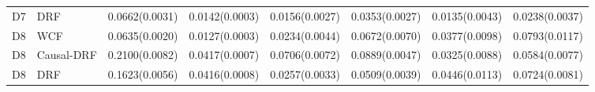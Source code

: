 \begin{table}[t]
\begin{tabular}{llrrrrrr}
D7 & DRF & 0.0662(0.0031) & 0.0142(0.0003) & 0.0156(0.0027) & 0.0353(0.0027) & 0.0135(0.0043) & 0.0238(0.0037) \\
D8 & WCF & 0.0635(0.0020) & 0.0127(0.0003) & 0.0234(0.0044) & 0.0672(0.0070) & 0.0377(0.0098) & 0.0793(0.0117) \\
D8 & Causal-DRF & 0.2100(0.0082) & 0.0417(0.0007) & 0.0706(0.0072) & 0.0889(0.0047) & 0.0325(0.0088) & 0.0584(0.0077) \\
D8 & DRF & 0.1623(0.0056) & 0.0416(0.0008) & 0.0257(0.0033) & 0.0509(0.0039) & 0.0446(0.0113) & 0.0724(0.0081) \\
\bottomrule
\end{tabular}
\end{table}
